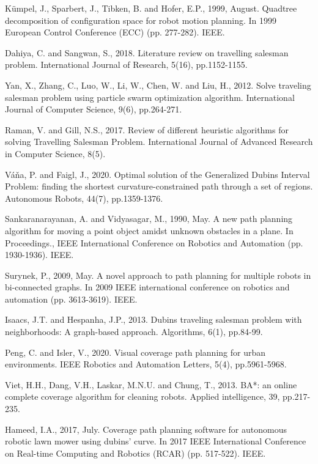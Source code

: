 \begin{thebibliography}{9}
\bibitem
Kümpel, J., Sparbert, J., Tibken, B. and Hofer, E.P., 1999, August. Quadtree decomposition of configuration space for robot motion planning. In 1999 European Control Conference (ECC) (pp. 277-282). IEEE.



\bibitem
Dahiya, C. and Sangwan, S., 2018. Literature review on travelling salesman problem. International Journal of Research, 5(16), pp.1152-1155.

\bibitem
Yan, X., Zhang, C., Luo, W., Li, W., Chen, W. and Liu, H., 2012. Solve traveling salesman problem using particle swarm optimization algorithm. International Journal of Computer Science, 9(6), pp.264-271.

\bibitem
Raman, V. and Gill, N.S., 2017. Review of different heuristic algorithms for solving Travelling Salesman Problem. International Journal of Advanced Research in Computer Science, 8(5).

\bibitem
Váňa, P. and Faigl, J., 2020. Optimal solution of the Generalized Dubins Interval Problem: finding the shortest curvature-constrained path through a set of regions. Autonomous Robots, 44(7), pp.1359-1376.

\bibitem
Sankaranarayanan, A. and Vidyasagar, M., 1990, May. A new path planning algorithm for moving a point object amidst unknown obstacles in a plane. In Proceedings., IEEE International Conference on Robotics and Automation (pp. 1930-1936). IEEE.

\bibitem
Surynek, P., 2009, May. A novel approach to path planning for multiple robots in bi-connected graphs. In 2009 IEEE international conference on robotics and automation (pp. 3613-3619). IEEE.

\bibitem
Isaacs, J.T. and Hespanha, J.P., 2013. Dubins traveling salesman problem with neighborhoods: A graph-based approach. Algorithms, 6(1), pp.84-99.

\bibitem
Peng, C. and Isler, V., 2020. Visual coverage path planning for urban environments. IEEE Robotics and Automation Letters, 5(4), pp.5961-5968.

\bibitem
Viet, H.H., Dang, V.H., Laskar, M.N.U. and Chung, T., 2013. BA*: an online complete coverage algorithm for cleaning robots. Applied intelligence, 39, pp.217-235.

\bibitem
Hameed, I.A., 2017, July. Coverage path planning software for autonomous robotic lawn mower using dubins' curve. In 2017 IEEE International Conference on Real-time Computing and Robotics (RCAR) (pp. 517-522). IEEE.


\end{thebibliography}
